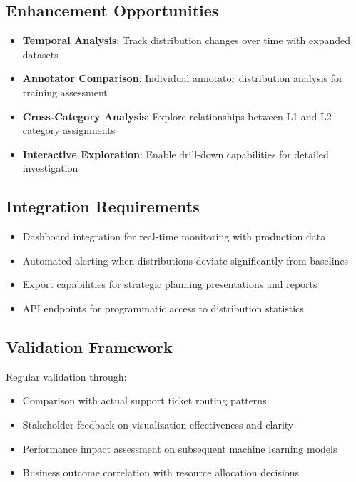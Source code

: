 \documentclass[11pt]{article}
\begin{document}
\subsection{Enhancement Opportunities}
\begin{itemize}
\item \textbf{Temporal Analysis}: Track distribution changes over time with expanded datasets
\item \textbf{Annotator Comparison}: Individual annotator distribution analysis for training assessment
\item \textbf{Cross-Category Analysis}: Explore relationships between L1 and L2 category assignments
\item \textbf{Interactive Exploration}: Enable drill-down capabilities for detailed investigation
\end{itemize}

\subsection{Integration Requirements}
\begin{itemize}
\item Dashboard integration for real-time monitoring with production data
\item Automated alerting when distributions deviate significantly from baselines
\item Export capabilities for strategic planning presentations and reports
\item API endpoints for programmatic access to distribution statistics
\end{itemize}

\subsection{Validation Framework}
Regular validation through:
\begin{itemize}
\item Comparison with actual support ticket routing patterns
\item Stakeholder feedback on visualization effectiveness and clarity
\item Performance impact assessment on subsequent machine learning models
\item Business outcome correlation with resource allocation decisions
\end{itemize}
\end{document}
